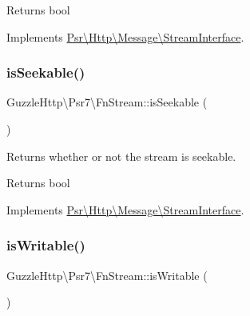 \begin{DoxyReturn}{Returns}
bool 
\end{DoxyReturn}


Implements \hyperlink{interfacePsr_1_1Http_1_1Message_1_1StreamInterface_aecf78407aa241622ae200a9faa471d32}{Psr\textbackslash{}\+Http\textbackslash{}\+Message\textbackslash{}\+Stream\+Interface}.

\mbox{\label{classGuzzleHttp_1_1Psr7_1_1FnStream_a6e71bee66417963b7dbab145c209da6c}} 
\subsubsection{\texorpdfstring{is\+Seekable()}{isSeekable()}}
{\footnotesize\ttfamily Guzzle\+Http\textbackslash{}\+Psr7\textbackslash{}\+Fn\+Stream\+::is\+Seekable (\begin{DoxyParamCaption}{ }\end{DoxyParamCaption})}

Returns whether or not the stream is seekable.

\begin{DoxyReturn}{Returns}
bool 
\end{DoxyReturn}


Implements \hyperlink{interfacePsr_1_1Http_1_1Message_1_1StreamInterface_ad4a27548fd51bd12390d798981a1622b}{Psr\textbackslash{}\+Http\textbackslash{}\+Message\textbackslash{}\+Stream\+Interface}.

\mbox{\label{classGuzzleHttp_1_1Psr7_1_1FnStream_a4ea21aece18cb3b83315dba95dcac9c7}} 
\subsubsection{\texorpdfstring{is\+Writable()}{isWritable()}}
{\footnotesize\ttfamily Guzzle\+Http\textbackslash{}\+Psr7\textbackslash{}\+Fn\+Stream\+::is\+Writable (\begin{DoxyParamCaption}{ }\end{DoxyParamCaption})}

